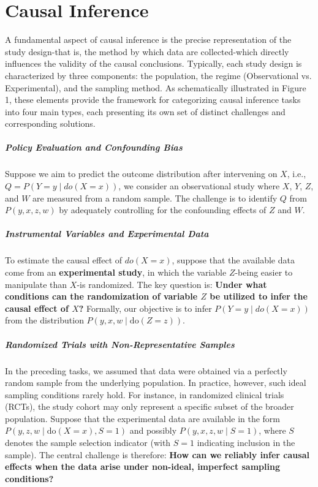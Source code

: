 \chapter{Causal Inference}\label{chap:causal-inference}

A fundamental aspect of causal inference is the precise representation of the study design-that is, the method by which data are collected-which directly influences the validity of the causal conclusions. Typically, each study design is characterized by three components: the population, the regime (Observational vs. Experimental), and the sampling method. As schematically illustrated in Figure 1, these elements provide the framework for categorizing causal inference tasks into four main types, each presenting its own set of distinct challenges and corresponding solutions.

\paragraph{Policy Evaluation and Confounding Bias}
Suppose we aim to predict the outcome distribution after intervening on \(X\), i.e.,  \(Q=P(Y=y\mid do(X=x))\), we consider an observational study where \(X\), \(Y\), \(Z\), and \(W\) are measured from a random sample. The challenge is to identify \(Q\) from  \(P(y,x,z,w)\) by adequately controlling for the confounding effects of \(Z\) and \(W\).

\paragraph{Instrumental Variables and Experimental Data}
To estimate the causal effect of \(do(X = x)\), suppose that the available data come from an \textbf{experimental study}, in which the variable \(Z\)-being easier to manipulate than \(X\)-is randomized. The key question is: \textbf{Under what conditions can the randomization of variable \(Z\) be utilized to infer the causal effect of \(X\)?} Formally, our objective is to infer  \(P(Y = y \mid do(X = x))\) from the distribution \(P(y, x, w \mid \text{do}(Z = z))\).

\paragraph{Randomized Trials with Non-Representative Samples}
In the preceding tasks, we assumed that data were obtained via a perfectly random sample from the underlying population. In practice, however, such ideal sampling conditions rarely hold. For instance, in randomized clinical trials (RCTs), the study cohort may only represent a specific subset of the broader population. Suppose that the experimental data are available in the form \(P(y,z,w\mid \text{do}(X=x), S=1)\) and possibly \(P(y,x,z,w\mid S=1)\), where \(S\) denotes the sample selection indicator (with \(S=1\) indicating inclusion in the sample). The central challenge is therefore: \textbf{How can we reliably infer causal effects when the data arise under non-ideal, imperfect sampling conditions?}

